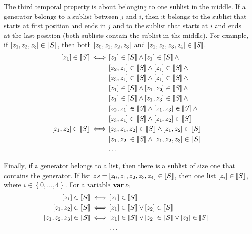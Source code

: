 \documentclass[12pt,openright,twoside,a4paper,oldfontcommands,english,brazil,final]{abntex2}
\newtheorem{definition}{Definition}[chapter]
\theoremstyle{theo}
\newcommand{\distinctlist}{%
  distinct list\footnote{Although some may use the terminology ``disjoint list'' to call a list of non-repeated elements, we use the same terminology (distinct list) of the theories built-in the \isabellehol tool.}%
  \global\renewcommand{\distinctlist}{distinct list}%
  \global\renewcommand{\distinctlists}{distinct lists}%
}
\newcommand{\distinctlists}{%
  distinct lists\footnote{Although some may use the terminology ``disjoint lists'' to call the lists of non-repeated elements, we use the same terminology (distinct lists) of the theories built-in the \isabellehol tool.}%
  \global\renewcommand{\distinctlist}{distinct list\xspace}%
  \global\renewcommand{\distinctlists}{distinct lists\xspace}%
  \xspace%
}
\newcommand{\isabellehol}[1][]{%
  Isabelle/HOL{#1}\index{Isabelle/HOL}~2015\footnote{The 2002 tutorial is reported in~\cite{NPW2002}, but there is a newer version published with the tool itself.
  The tool and the tutorial are available on their website at \url{http://isabelle.in.tum.de}.}%
  \global\renewcommand{\isabellehol}[1][]{Isabelle/HOL{#1}\index{Isabelle/HOL}\xspace}\xspace %
}
\def\varop{\ensuremath\operatorname{\mathbf{var}}}
\newcommand{\var}[1]{\ensuremath\varop #1}
\def\Tempotext{Tempo\xspace}
\newcommand{\listsin}[1]{\ensuremath\left[ #1 \right]}
\newcommand{\denote}[1]{\ensuremath\left[\!\left[#1\right]\!\right]}
\begin{document}
The third temporal property is about belonging to one sublist in the middle.
If a generator belongs to a sublist between $j$ and $i$, then it belongs to the sublist that starts at first position and ends in $j$ and to the sublist that starts at $i$ and ends at the last position (both sublists contain the sublist in the middle).
For example, if $\listsin{z_1,z_2,z_3} \in \denote{S}$, then both $\listsin{z_0,z_1,z_2,z_3}$ and $\listsin{z_1,z_2,z_3,z_4} \in \denote{S}$.
%
%
\begin{align}
\listsin{z_1} \in \denote{S} \iff &
  \listsin{z_1} \in \denote{S} \land \listsin{z_1} \in \denote{S}\land\nonumber\\
  & \listsin{z_2,z_1} \in \denote{S} \land \listsin{z_1} \in \denote{S} \land\nonumber\\
  & \listsin{z_3,z_1} \in \denote{S} \land \listsin{z_1} \in \denote{S} \land\nonumber\\
  & \listsin{z_1} \in \denote{S} \land \listsin{z_1,z_2} \in \denote{S} \land\nonumber\\
  & \listsin{z_1} \in \denote{S} \land \listsin{z_1,z_3} \in \denote{S} \land\nonumber\\
  & \listsin{z_2,z_1} \in \denote{S} \land \listsin{z_1,z_3} \in \denote{S}\land\nonumber\\
  & \listsin{z_3,z_1} \in \denote{S} \land \listsin{z_1,z_2} \in \denote{S}\nonumber\\
\listsin{z_1,z_2} \in \denote{S} \iff &
  \listsin{z_3,z_1,z_2} \in \denote{S} \land \listsin{z_1,z_2} \in \denote{S}\nonumber\\
  & \listsin{z_1,z_2} \in \denote{S} \land \listsin{z_1,z_2,z_3} \in \denote{S}\nonumber\\
  & \ldots\nonumber
\end{align}

Finally, if a generator belongs to a list, then there is a sublist of size one that contains the generator.
If list $zs=\listsin{z_0,z_1,z_2,z_3,z_4} \in \denote{S}$, then one list $\listsin{z_i} \in \denote{S}$, where $i \in \left\{0,\ldots,4\right\}$.
For a variable $\var{z_1}$
%
%
\begin{align}
\listsin{z_1} \in \denote{S} \iff 
  & \listsin{z_1} \in \denote{S}\nonumber\\
\listsin{z_1,z_2} \in \denote{S} \iff
  & \listsin{z_1} \in \denote{S} \lor \listsin{z_2} \in \denote{S}\nonumber\\
\listsin{z_1,z_2,z_3} \in \denote{S} \iff
  & \listsin{z_1} \in \denote{S} \lor \listsin{z_2} \in \denote{S} \lor \listsin{z_3} \in \denote{S}\nonumber\\
  & \ldots\nonumber
\end{align}
\end{document}
